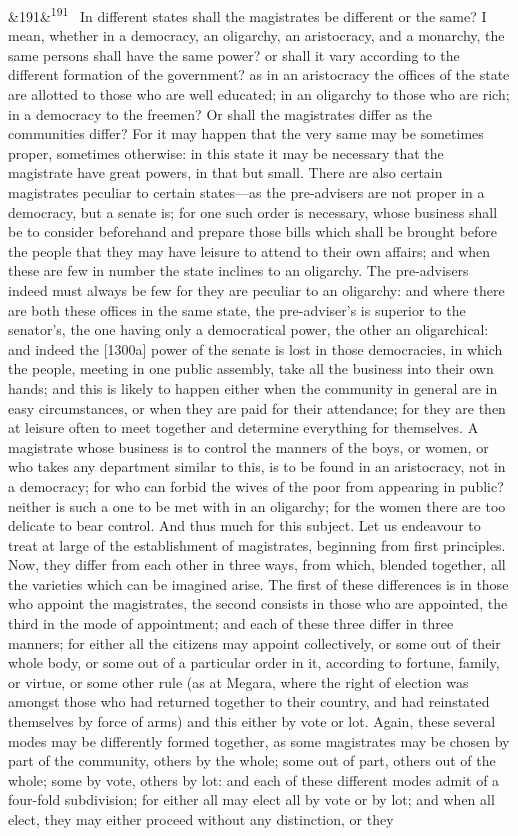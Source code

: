 \documentclass[12pt]{article}
\newcommand{\para}[1][]{\par\noindent\ifx&#1&\else\textsuperscript{\footnotesize #1}~\fi}
\begin{document}
\para[191] In different states shall the magistrates be different or the same? I mean, whether in a democracy, an oligarchy, an aristocracy, and a monarchy, the same persons shall have the same power? or shall it vary according to the different formation of the government? as in an aristocracy the offices of the state are allotted to those who are well educated; in an oligarchy to those who are rich; in a democracy to the freemen? Or shall the magistrates differ as the communities differ? For it may happen that the very same may be sometimes proper, sometimes otherwise: in this state it may be necessary that the magistrate have great powers, in that but small. There are also certain magistrates peculiar to certain states---as the pre-advisers are not proper in a democracy, but a senate is; for one such order is necessary, whose business shall be to consider beforehand and prepare those bills which shall be brought before the people that they may have leisure to attend to their own affairs; and when these are few in number the state inclines to an oligarchy. The pre-advisers indeed must always be few for they are peculiar to an oligarchy: and where there are both these offices in the same state, the pre-adviser's is superior to the senator's, the one having only a democratical power, the other an oligarchical: and indeed the [1300a] power of the senate is lost in those democracies, in which the people, meeting in one public assembly, take all the business into their own hands; and this is likely to happen either when the community in general are in easy circumstances, or when they are paid for their attendance; for they are then at leisure often to meet together and determine everything for themselves. A magistrate whose business is to control the manners of the boys, or women, or who takes any department similar to this, is to be found in an aristocracy, not in a democracy; for who can forbid the wives of the poor from appearing in public? neither is such a one to be met with in an oligarchy; for the women there are too delicate to bear control. And thus much for this subject. Let us endeavour to treat at large of the establishment of magistrates, beginning from first principles. Now, they differ from each other in three ways, from which, blended together, all the varieties which can be imagined arise. The first of these differences is in those who appoint the magistrates, the second consists in those who are appointed, the third in the mode of appointment; and each of these three differ in three manners; for either all the citizens may appoint collectively, or some out of their whole body, or some out of a particular order in it, according to fortune, family, or virtue, or some other rule (as at Megara, where the right of election was amongst those who had returned together to their country, and had reinstated themselves by force of arms) and this either by vote or lot. Again, these several modes may be differently formed together, as some magistrates may be chosen by part of the community, others by the whole; some out of part, others out of the whole; some by vote, others by lot: and each of these different modes admit of a four-fold subdivision; for either all may elect all by vote or by lot; and when all elect, they may either proceed without any distinction, or they 
\end{document}
